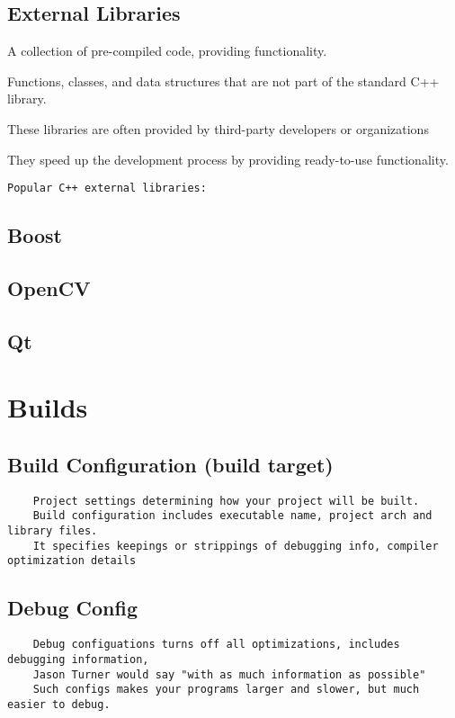 \documentclass[openany]{report}
\begin{document}
\subsection{External Libraries}

A collection of pre-compiled code, providing functionality.

Functions, classes, and data structures that are not part of the standard C++ library.

These libraries are often provided by third-party developers or organizations

They speed up the development process by providing ready-to-use functionality. 

\begin{verbatim}
Popular C++ external libraries:
\end{verbatim}

\subsection{Boost}

\subsection{OpenCV}

\subsection{Qt}

\section{Builds}
\subsection{Build Configuration (build target)}

\begin{verbatim}
    Project settings determining how your project will be built. 
    Build configuration includes executable name, project arch and library files. 
    It specifies keepings or strippings of debugging info, compiler optimization details 
\end{verbatim}

\subsection{Debug Config}

\begin{verbatim}
    Debug configuations turns off all optimizations, includes debugging information,
    Jason Turner would say "with as much information as possible"
    Such configs makes your programs larger and slower, but much easier to debug. 
\end{verbatim}
\end{document}
